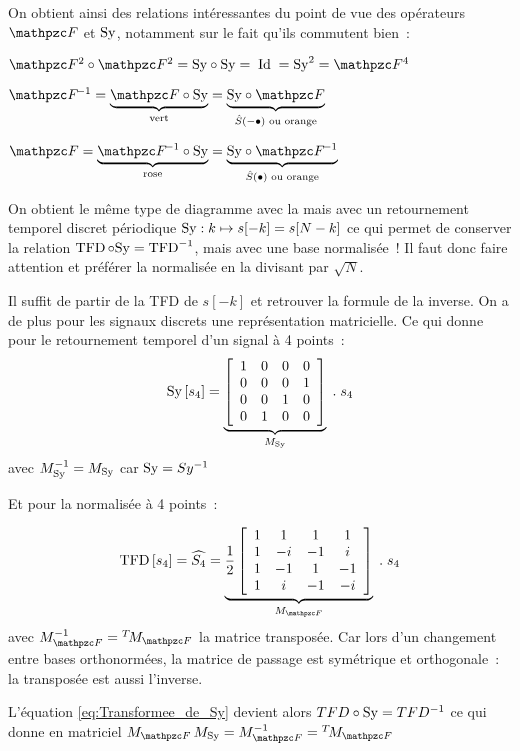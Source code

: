 On obtient ainsi des relations intéressantes du point de vue des
opérateurs $\F$ et $\mathrm{Sy}$, notamment sur le fait qu'ils commutent
bien~:
\begin{description}
\item $\F^2\circ\F^2 = \Sy\circ\Sy =\; \Id \; = \Sy^2 = \F^4$
\item
  $\Finv = \caCest{\F\circ\Sy}{\text{vert}} =
  \caCest{\Sy\circ\F}{\hat{S}\p{-\bullet}\text{ ou orange}}$
\item
  $\F = \caCest{\Finv\circ\Sy}{\text{rose}} =
  \caCest{\Sy\circ\Finv}{\hat{S}\p{\bullet}\text{ ou orange}}$
\end{description}
\begin{remarque} 
  
  On obtient le même type de diagramme avec la \TFD{} mais avec un
  retournement temporel discret périodique
  $\mathrm{Sy} : k \mapsto s[-k]= s[N-k]$ ce qui permet de conserver la
  relation $\mathop{\mathrm{TFD}}\circ\mathrm{Sy}=\mathop{\mathrm{TFD}}^{-1}$, mais avec une base normalisée~!
  Il faut donc faire attention et préférer la \TFD{} normalisée en la
  divisant par $\sqrt{N}$.
  
  Il suffit de partir de la TFD de $s[-k]$ et retrouver la formule de
  la \TFD{} inverse. On a de plus pour les signaux discrets une
  représentation matricielle. Ce qui donne pour le retournement
  temporel d'un signal à 4 points~:
  \begin{equation}
    \label{eq:sy_matriciel}
    \mathrm{Sy}\left[s_4\right] = \underbrace{
      \left[
        \begin{array}{cccc}
          1 & 0 & 0 & 0\\
          0 & 0 & 0 & 1\\
          0 & 0 & 1 & 0\\
          0 & 1 & 0 & 0
        \end{array}\right]}_{M_{\mathrm{Sy}}}\;.\;s_4
  \end{equation}
  avec $M_{\mathrm{Sy}}^{-1}=M_{\mathrm{Sy}}$ car $\mathrm{Sy}=Sy^{-1}$
      
  Et pour la \TFD{} normalisée à 4 points~:
  
  \begin{equation}
    \label{eq:tfd4_matriciel}
    \mTFD\b{s_4} = \widehat{S_4} = \caCest{
      \frac{1}{2}\left[
        \begin{array}{cccc}
          1 & 1 & 1 & 1\\
          1 & -i & -1 & i\\
          1 & -1 & 1 & -1\\
          1 & i & -1 & -i
        \end{array}
      \right]}{M_{\F}}\;.\;s_4
  \end{equation}
  avec $M_{\F}^{-1}=\Tr{M_{\F}}$ la matrice transposée. Car lors d'un
  changement entre bases orthonormées, la matrice de passage est
  symétrique et orthogonale~: la transposée est aussi l'inverse.
  
  
  L'équation \eqref{eq:Transformee_de_Sy} devient alors
  $TFD\circ\mathrm{Sy} = TFD{}^{-1}$ ce qui donne en matriciel
  $M_{\F}\,M_{\Sy} = M_{\F}^{-1} = \Tr{M_{\F}} $
\end{remarque}

